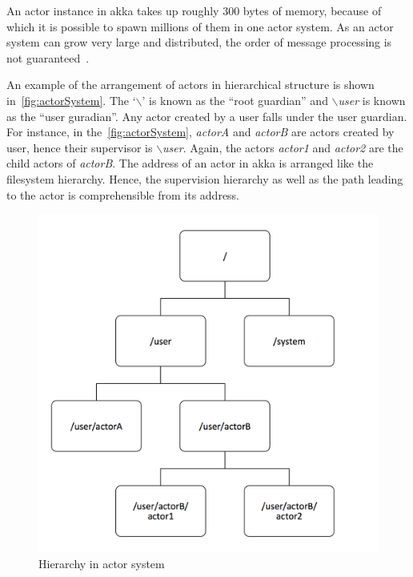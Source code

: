  An actor instance in akka takes up roughly 300 bytes of memory, because of which it is possible to spawn millions of them in one actor system. As an actor system can grow very large and distributed, the order of message processing is not guaranteed~\cite{akkaJavaDoc}.

  An example of the arrangement of actors in hierarchical structure is shown in~\autoref{fig:actorSystem}. The ‘{$\backslash$}’ is known as the “root guardian” and \emph{$\backslash$user} is known as the “user guradian”. Any actor created by a user falls under the user guardian. For instance, in the~\autoref{fig:actorSystem}, \emph{actorA} and \emph{actorB} are actors created by user, hence their supervisor is \emph{$\backslash$user}. Again, the actors \emph{actor1} and \emph{actor2} are the child actors of \emph{actorB}. The address of an actor in akka is arranged like the filesystem hierarchy. Hence, the supervision hierarchy as well as the path leading to the actor is comprehensible from its address.

\begin{figure}[H]
  \centering
  \includegraphics[scale=0.5]{figures/actorSystem}
  \caption[Hierarchy in actor system]{Hierarchy in actor system~\cite{akkaJavaDoc}}
  \label{fig:actorSystem}
\end{figure}

